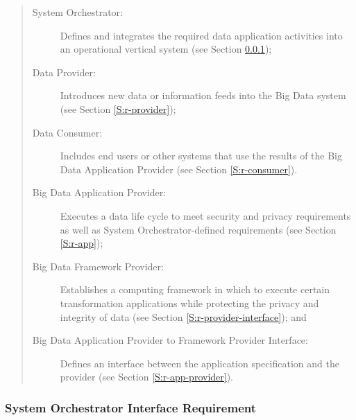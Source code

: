 \documentclass[10pt]{article}
\begin{document}
\begin{quote}
\begin{description}

\item[System Orchestrator:] Defines and integrates the required data
  application activities into an operational vertical system (see
  Section \ref{S:r-orchestrator});

\item[Data Provider:] Introduces new data or information feeds into
  the Big Data system  (see
  Section \ref{S:r-provider});

\item[Data Consumer:] Includes end users or other systems that use the
  results of the Big Data Application Provider  (see
  Section \ref{S:r-consumer}).

\item[Big Data Application Provider:] Executes a data life cycle to
  meet security and privacy requirements as well as System
  Orchestrator-defined requirements  (see
  Section \ref{S:r-app});

\item [Big Data Framework Provider:] Establishes a computing framework
  in which to execute certain transformation applications while
  protecting the privacy and integrity of data  (see
  Section \ref{S:r-provider-interface}); and

\item[Big Data Application Provider to Framework Provider
  Interface:] Defines an interface between the application
  specification and the provider (see Section \ref{S:r-app-provider}).

\end{description}
\end{quote}


\subsubsection{System Orchestrator Interface Requirement}\label{S:r-orchestrator}
\end{document}
